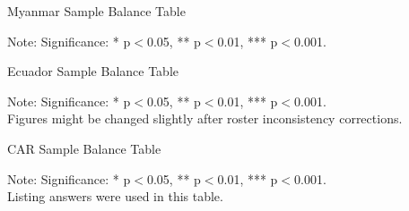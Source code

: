 \documentclass[11pt,harvard]{article}
\begin{document}
	\begin{table}[htbp]
	\centering
	\begin{adjustbox}{max width=\textwidth}
		\begin{threeparttable}
			\caption{Myanmar Sample Balance Table}
			\scriptsize
			 
			\label{tab:Myanmar_Modality_Demo_Balance}
			\begin{tablenotes}
				\item Note: Significance: * p$<$0.05, ** p$<$0.01, *** p$<$0.001. 
			\end{tablenotes}
		\end{threeparttable}
	\end{adjustbox}
\end{table}



\begin{table}[htbp]
	\centering
	\begin{adjustbox}{max width=\textwidth}
		\begin{threeparttable}
			\caption{Ecuador Sample Balance Table}
			\scriptsize
			 
			\label{tab:Ecuador_Modality_Demo_Balance}
			\begin{tablenotes}
				\item Note: Significance: * p$<$0.05, ** p$<$0.01, *** p$<$0.001. \\
						 Figures might be changed slightly after roster inconsistency corrections.
			\end{tablenotes}
		\end{threeparttable}
	\end{adjustbox}
\end{table}



	\begin{table}[htbp]
	\centering
	\begin{adjustbox}{max width=\textwidth}
		\begin{threeparttable}
			\caption{CAR Sample Balance Table}
			\scriptsize
			 
			\label{tab:CAR_Modality_Own_Phone_Demo_Balance}
			\begin{tablenotes}
				\item Note: Significance: * p$<$0.05, ** p$<$0.01, *** p$<$0.001. \\
						 Listing answers were used in this table.
			\end{tablenotes}
		\end{threeparttable}
	\end{adjustbox}
\end{table}
\end{document}
